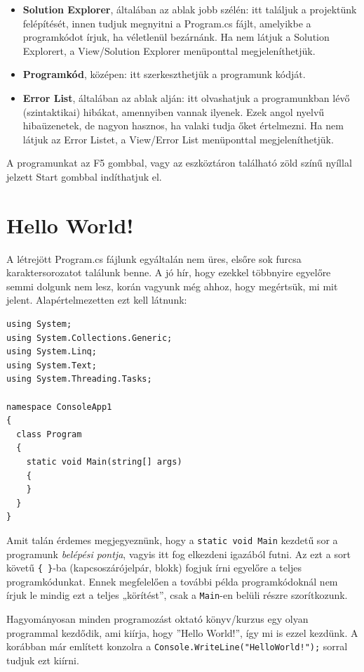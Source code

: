 \documentclass[a4paper]{article}
\begin{document}
\begin{itemize}
	\item \textbf{Solution Explorer}, általában az ablak jobb szélén: itt találjuk a projektünk felépítését, innen tudjuk megnyitni a Program.cs fájlt, amelyikbe a programkódot írjuk, ha véletlenül bezárnánk. Ha nem látjuk a Solution Explorert, a View/Solution Explorer menüponttal megjeleníthetjük.
	\item \textbf{Programkód}, középen: itt szerkeszthetjük a programunk kódját.
	\item \textbf{Error List}, általában az ablak alján: itt olvashatjuk a programunkban lévő (szintaktikai) hibákat, amennyiben vannak ilyenek. Ezek angol nyelvű hibaüzenetek, de nagyon hasznos, ha valaki tudja őket értelmezni. Ha nem látjuk az Error Listet, a View/Error List menüponttal megjeleníthetjük.
\end{itemize}

A programunkat az F5 gombbal, vagy az eszköztáron található zöld színű nyíllal jelzett Start gombbal indíthatjuk el.

\section{Hello World!}
A létrejött Program.cs fájlunk egyáltalán nem üres, elsőre sok furcsa karaktersorozatot találunk benne. A jó hír, hogy ezekkel többnyire egyelőre semmi dolgunk nem lesz, korán vagyunk még ahhoz, hogy megértsük, mi mit jelent. Alapértelmezetten ezt kell látnunk:

\begin{lstlisting}[caption=Hello World!, label=lst:hello]
using System;
using System.Collections.Generic;
using System.Linq;
using System.Text;
using System.Threading.Tasks;

namespace ConsoleApp1
{
  class Program
  {
    static void Main(string[] args)
    {
    }
  }
}
\end{lstlisting}

Amit talán érdemes megjegyeznünk, hogy a \lstinline{static void Main} kezdetű sor a programunk \emph{belépési pontja}, vagyis itt fog elkezdeni igazából futni. Az ezt a sort követű \lstinline!{ }!-ba (kapcsoszárójelpár, blokk) fogjuk írni egyelőre a teljes programkódunkat. Ennek megfelelően a további példa programkódoknál nem írjuk le mindig ezt a teljes „körítést”, csak a \lstinline{Main}-en belüli részre szorítkozunk.

Hagyományosan minden programozást oktató könyv/kurzus egy olyan programmal kezdődik, ami kiírja, hogy ”Hello World!”, így mi is ezzel kezdünk. A korábban már említett konzolra a \lstinline{Console.WriteLine("HelloWorld!");} sorral tudjuk ezt kiírni.
\end{document}
